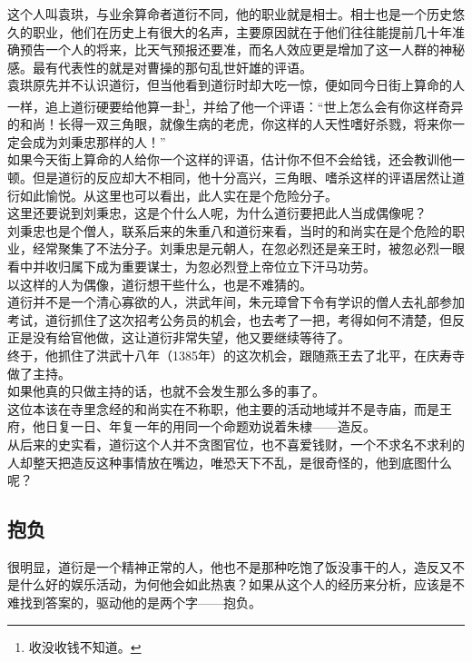 \begin{multicols}{\theparacolNo}
这个人叫袁珙，与业余算命者道衍不同，他的职业就是相士。相士也是一个历史悠久的职业，他们在历史上有很大的名声，主要原因就在于他们往往能提前几十年准确预告一个人的将来，比天气预报还要准，而名人效应更是增加了这一人群的神秘感。最有代表性的就是对曹操的那句乱世奸雄的评语。\\

袁珙原先并不认识道衍，但当他看到道衍时却大吃一惊，便如同今日街上算命的人一样，追上道衍硬要给他算一卦\footnote{收没收钱不知道。}，并给了他一个评语：“世上怎么会有你这样奇异的和尚！长得一双三角眼，就像生病的老虎，你这样的人天性嗜好杀戮，将来你一定会成为刘秉忠那样的人！”\\

如果今天街上算命的人给你一个这样的评语，估计你不但不会给钱，还会教训他一顿。但是道衍的反应却大不相同，他十分高兴，三角眼、嗜杀这样的评语居然让道衍如此愉悦。从这里也可以看出，此人实在是个危险分子。\\

这里还要说到刘秉忠，这是个什么人呢，为什么道衍要把此人当成偶像呢？\\

刘秉忠也是个僧人，联系后来的朱重八和道衍来看，当时的和尚实在是个危险的职业，经常聚集了不法分子。刘秉忠是元朝人，在忽必烈还是亲王时，被忽必烈一眼看中并收归属下成为重要谋士，为忽必烈登上帝位立下汗马功劳。\\

以这样的人为偶像，道衍想干些什么，也是不难猜的。\\

道衍并不是一个清心寡欲的人，洪武年间，朱元璋曾下令有学识的僧人去礼部参加考试，道衍抓住了这次招考公务员的机会，也去考了一把，考得如何不清楚，但反正是没有给官他做，这让道衍非常失望，他又要继续等待了。\\

终于，他抓住了洪武十八年（1385年）的这次机会，跟随燕王去了北平，在庆寿寺做了主持。\\

如果他真的只做主持的话，也就不会发生那么多的事了。\\

这位本该在寺里念经的和尚实在不称职，他主要的活动地域并不是寺庙，而是王府，他日复一日、年复一年的用同一个命题劝说着朱棣——造反。\\

从后来的史实看，道衍这个人并不贪图官位，也不喜爱钱财，一个不求名不求利的人却整天把造反这种事情放在嘴边，唯恐天下不乱，是很奇怪的，他到底图什么呢？\\

\subsection{抱负}
很明显，道衍是一个精神正常的人，他也不是那种吃饱了饭没事干的人，造反又不是什么好的娱乐活动，为何他会如此热衷？如果从这个人的经历来分析，应该是不难找到答案的，驱动他的是两个字——抱负。\\


\end{multicols}
